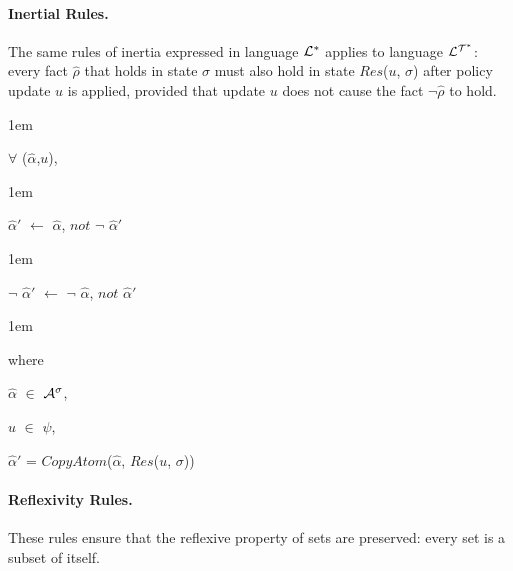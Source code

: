 \documentclass[11pt]{report}
\newenvironment{vquote}
{
  \begin{list}{}{\leftmargin 1em}\item[]
}
{
  \end{list}
}
\begin{document}
          \paragraph
            {\bf Inertial Rules.}

            The same rules of inertia expressed in language ${\cal L^*}$
            applies to language ${\cal L^{T^*}}$: every fact $\hat{\rho}$
            that holds in state $\sigma$ must also hold in state
            $Res$($u$, $\sigma$) after policy update $u$ is applied,
            provided that update $u$ does not cause the fact
            $\lnot\hat{\rho}$ to hold.

            \begin{vquote}
              $\forall$ ($\hat{\alpha}$,$u$),
            \end{vquote}

            \begin{vquote}
              $\hat{\alpha}'$
              $\leftarrow$
              $\hat{\alpha}$,
              $not$ $\lnot$ $\hat{\alpha}'$
            \end{vquote}

            \begin{vquote}
              $\lnot$ $\hat{\alpha}'$
              $\leftarrow$ $\lnot$
              $\hat{\alpha}$,
              $not$ $\hat{\alpha}'$
            \end{vquote}

            \begin{vquote}
              where

              \hspace{1em}
              $\hat{\alpha}$ $\in$ ${\cal A}^{\sigma}$,

              \hspace{1em}
              $u$ $\in$ $\psi$,

              \hspace{1em}
              $\hat{\alpha}'$ = $CopyAtom$($\hat{\alpha}$, $Res$($u$, $\sigma$))
            \end{vquote}

          \paragraph
            {\bf Reflexivity Rules.}

            These rules ensure that the reflexive property of sets are
            preserved: every set is a subset of itself.
\end{document}
